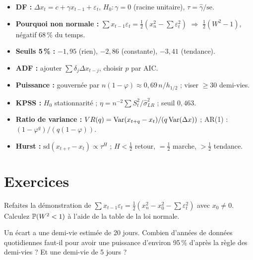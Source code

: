 \begin{whiteboard}
\begin{itemize}[leftmargin=1.2em]
\item \textbf{DF :} $\Delta x_t = c + \gamma x_{t-1} + \varepsilon_t$, $H_0 : \gamma = 0$ (racine unitaire), $\tau = \hat\gamma/\mathrm{se}$.
\item \textbf{Pourquoi non normale :} $\sum x_{t-1}\varepsilon_t = \frac12(x_n^2 - \sum\varepsilon_t^2)$ $\Rightarrow$ $\frac12(W^2-1)$, négatif 68\,\% du temps.
\item \textbf{Seuils 5\,\% :} $-1{,}95$ (rien), $-2{,}86$ (constante), $-3{,}41$ (tendance).
\item \textbf{ADF :} ajouter $\sum\delta_j\Delta x_{t-j}$, choisir $p$ par AIC.
\item \textbf{Puissance :} gouvernée par $n(1-\varphi)\approx 0{,}69\,n/h_{1/2}$ ; viser $\ge 30$ demi-vies.
\item \textbf{KPSS :} $H_0$ stationnarité ; $\eta = n^{-2}\sum S_t^2/\hat\sigma^2_{LR}$ ; seuil $0{,}463$.
\item \textbf{Ratio de variance :} $VR(q) = \operatorname{Var}(x_{t+q}-x_t)/(q\operatorname{Var}(\Delta x))$ ; AR(1) : $(1-\varphi^q)/(q(1-\varphi))$.
\item \textbf{Hurst :} $\mathrm{sd}(x_{t+\tau}-x_t)\propto\tau^H$ ; $H<\frac12$ retour, $=\frac12$ marche, $>\frac12$ tendance.
\end{itemize}
\end{whiteboard}

\section{Exercices}

\begin{exercise}
Refaites la démonstration de $\sum x_{t-1}\varepsilon_t = \frac12(x_n^2 - x_0^2 - \sum\varepsilon_t^2)$ avec $x_0 \ne 0$. Calculez $\mathbb{P}(W^2 < 1)$ à l'aide de la table de la loi normale.
\end{exercise}

\begin{exercise}
Un écart a une demi-vie estimée de 20 jours. Combien d'années de données quotidiennes faut-il pour avoir une puissance d'environ 95\,\% d'après la règle des demi-vies ? Et une demi-vie de 5 jours ?
\end{exercise}

